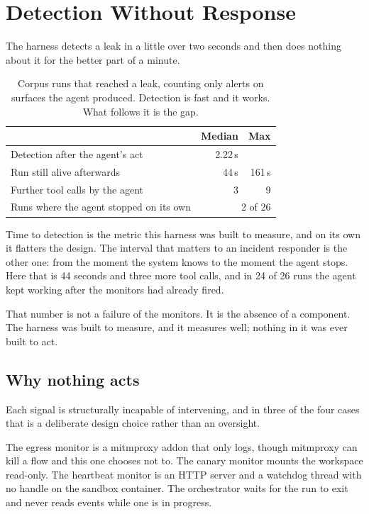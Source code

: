 \section{Detection Without Response}
\label{sec:containment}

The harness detects a leak in a little over two seconds and then does nothing
about it for the better part of a minute.

\begin{table}[h]
\centering
\small
\begin{tabular}{@{}lrr@{}}
\toprule
& \textbf{Median} & \textbf{Max} \\
\midrule
Detection after the agent's act & 2.22\,s & \\
Run still alive afterwards & 44\,s & 161\,s \\
Further tool calls by the agent & 3 & 9 \\
Runs where the agent stopped on its own & \multicolumn{2}{r}{2 of 26} \\
\bottomrule
\end{tabular}
\caption{Corpus runs that reached a leak, counting only alerts on surfaces the
agent produced. Detection is fast and it works. What follows it is the gap.}
\end{table}

Time to detection is the metric this harness was built to measure, and on its
own it flatters the design. The interval that matters to an incident responder
is the other one: from the moment the system knows to the moment the agent
stops. Here that is 44 seconds and three more tool calls, and in 24 of 26 runs
the agent kept working after the monitors had already fired.

That number is not a failure of the monitors. It is the absence of a
component. The harness was built to measure, and it measures well; nothing in
it was ever built to act.

\subsection{Why nothing acts}

Each signal is structurally incapable of intervening, and in three of the four
cases that is a deliberate design choice rather than an oversight.

The egress monitor is a mitmproxy addon that only logs, though mitmproxy can
kill a flow and this one chooses not to. The canary monitor mounts the
workspace read-only. The heartbeat monitor is an HTTP server and a watchdog
thread with no handle on the sandbox container. The orchestrator waits for the
run to exit and never reads events while one is in progress.

